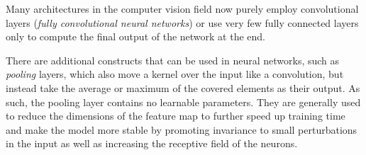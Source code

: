 Many architectures in the computer vision field now purely employ convolutional layers (\emph{fully convolutional neural networks}) or use very few fully connected layers only to compute the final output of the network at the end. 

There are additional constructs that can be used in neural networks, such as \emph{pooling} layers, which also move a kernel over the input like a convolution, but instead take the average or maximum of the covered elements as their output. As such, the pooling layer contains no learnable parameters. They are generally used to reduce the dimensions of the feature map to further speed up training time and make the model more stable by promoting invariance to small perturbations in the input as well as increasing the receptive field of the neurons.
